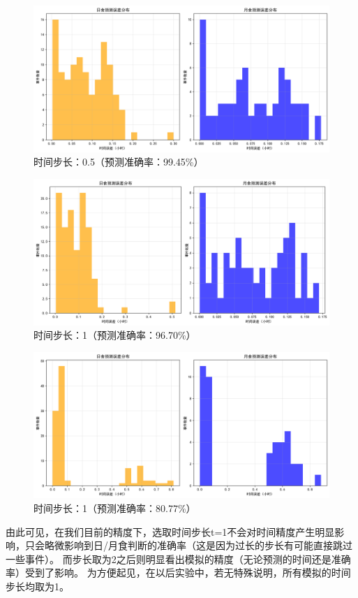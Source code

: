 \documentclass[hidelinks]{article}
\begin{document}
\begin{figure}[h]
    \centering
    \includegraphics[width=0.5\linewidth]{images/error_distribution_0.5.png}
    \caption{时间步长：0.5（预测准确率：99.45\%）}
    \label{fig:eclipse_error_0.5}
\end{figure}

\begin{figure}[h]
    \centering
    \includegraphics[width=0.5\linewidth]{images/error_distribution_1.png}
    \caption{时间步长：1（预测准确率：96.70\%）}
    \label{fig:eclipse_error_1}
\end{figure}

\begin{figure}[h]
    \centering
    \includegraphics[width=0.5\linewidth]{images/error_distribution_2.png}
    \caption{时间步长：1（预测准确率：80.77\%）}
    \label{fig:eclipse_error_2}
\end{figure}

由此可见，在我们目前的精度下，选取时间步长t=1不会对时间精度产生明显影响，只会略微影响到日/月食判断的准确率（这是因为过长的步长有可能直接跳过一些事件）。
而步长取为2之后则明显看出模拟的精度（无论预测的时间还是准确率）受到了影响。
为方便起见，在以后实验中，若无特殊说明，所有模拟的时间步长均取为1。\\
\end{document}
